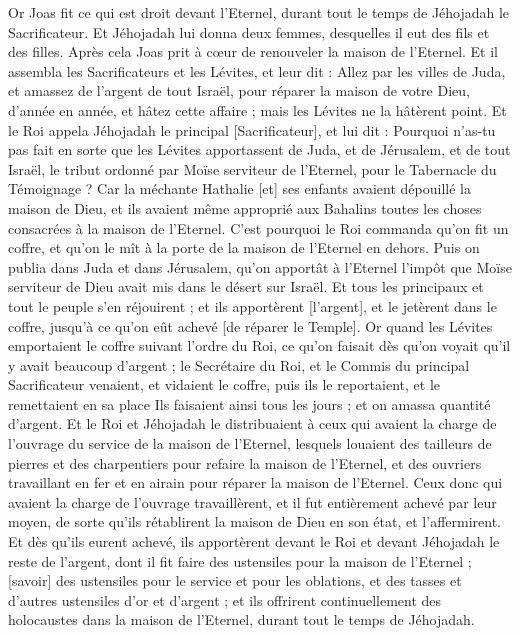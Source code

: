 \begin{multicols}{2}
Or Joas fit ce qui est droit devant l'Eternel, durant tout le temps de Jéhojadah le Sacrificateur.
Et Jéhojadah lui donna deux femmes, desquelles il eut des fils et des filles.
Après cela Joas prit à cœur de renouveler la maison de l'Eternel.
Et il assembla les Sacrificateurs et les Lévites, et leur dit : Allez par les villes de Juda, et amassez de l'argent de tout Israël, pour réparer la maison de votre Dieu, d'année en année, et hâtez cette affaire ; mais les Lévites ne la hâtèrent point.
Et le Roi appela Jéhojadah le principal [Sacrificateur], et lui dit : Pourquoi n'as-tu pas fait en sorte que les Lévites apportassent de Juda, et de Jérusalem, et de tout Israël, le tribut ordonné par Moïse serviteur de l'Eternel, pour le Tabernacle du Témoignage ?
Car la méchante Hathalie [et] ses enfants avaient dépouillé la maison de Dieu, et ils avaient même approprié aux Bahalins toutes les choses consacrées à la maison de l'Eternel.
C'est pourquoi le Roi commanda qu'on fit un coffre, et qu'on le mît à la porte de la maison de l'Eternel en dehors.
Puis on publia dans Juda et dans Jérusalem, qu'on apportât à l'Eternel l'impôt que Moïse serviteur de Dieu avait mis dans le désert sur Israël.
Et tous les principaux et tout le peuple s'en réjouirent ; et ils apportèrent [l'argent], et le jetèrent dans le coffre, jusqu'à ce qu'on eût achevé [de réparer le Temple].
Or quand les Lévites emportaient le coffre suivant l'ordre du Roi, ce qu'on faisait dès qu'on voyait qu'il y avait beaucoup d'argent ; le Secrétaire du Roi, et le Commis du principal Sacrificateur venaient, et vidaient le coffre, puis ils le reportaient, et le remettaient en sa place Ils faisaient ainsi tous les jours ; et on amassa quantité d'argent.
Et le Roi et Jéhojadah le distribuaient à ceux qui avaient la charge de l'ouvrage du service de la maison de l'Eternel, lesquels louaient des tailleurs de pierres et des charpentiers pour refaire la maison de l'Eternel, et des ouvriers travaillant en fer et en airain pour réparer la maison de l'Eternel.
Ceux donc qui avaient la charge de l'ouvrage travaillèrent, et il fut entièrement achevé par leur moyen, de sorte qu'ils rétablirent la maison de Dieu en son état, et l'affermirent.
Et dès qu'ils eurent achevé, ils apportèrent devant le Roi et devant Jéhojadah le reste de l'argent, dont il fit faire des ustensiles pour la maison de l'Eternel ; [savoir] des ustensiles pour le service et pour les oblations, et des tasses et d'autres ustensiles d'or et d'argent ; et ils offrirent continuellement des holocaustes dans la maison de l'Eternel, durant tout le temps de Jéhojadah.

\end{multicols}
